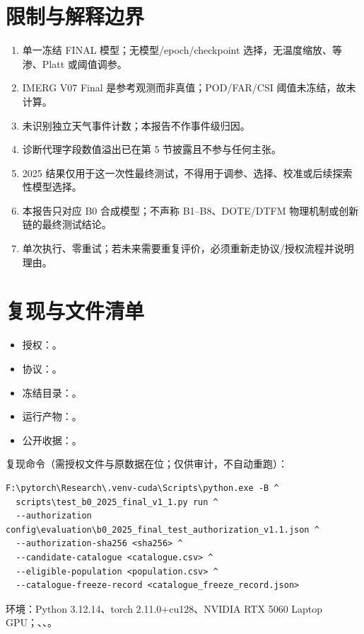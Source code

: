 \documentclass[UTF8,11pt,a4paper,fontset=windows]{ctexart}
\begin{document}
\section{限制与解释边界}
\begin{enumerate}
\item 单一冻结 FINAL 模型；无模型/epoch/checkpoint 选择，无温度缩放、等渗、Platt 或阈值调参。
\item IMERG V07 Final 是参考观测而非真值；POD/FAR/CSI 阈值未冻结，故未计算。
\item 未识别独立天气事件计数；本报告不作事件级归因。
\item 诊断代理字段数值溢出已在第 5 节披露且不参与任何主张。
\item 2025 结果仅用于这一次性最终测试，不得用于调参、选择、校准或后续探索性模型选择。
\item 本报告只对应 B0 合成模型；不声称 B1--B8、DOTE/DTFM 物理机制或创新链的最终测试结论。
\item 单次执行、零重试；若未来需要重复评价，必须重新走协议/授权流程并说明理由。
\end{enumerate}

\section{复现与文件清单}
\begin{itemize}
\item 授权：。
\item 协议：。
\item 冻结目录：。
\item 运行产物：。
\item 公开收据：。
\end{itemize}

复现命令（需授权文件与原数据在位；仅供审计，不自动重跑）：

\begin{verbatim}
F:\pytorch\Research\.venv-cuda\Scripts\python.exe -B ^
  scripts\test_b0_2025_final_v1_1.py run ^
  --authorization config\evaluation\b0_2025_final_test_authorization_v1.1.json ^
  --authorization-sha256 <sha256> ^
  --candidate-catalogue <catalogue.csv> ^
  --eligible-population <population.csv> ^
  --catalogue-freeze-record <catalogue_freeze_record.json>
\end{verbatim}

环境：Python 3.12.14、torch 2.11.0+cu128、NVIDIA RTX 5060 Laptop GPU；、、。
\end{document}
